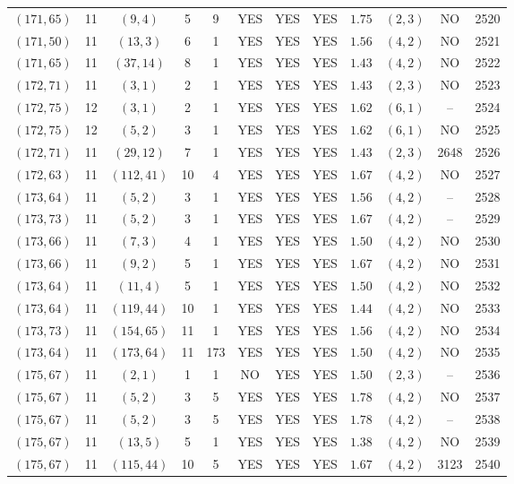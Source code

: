 \begin{longtable}{|c|c|c|c|c|c|c|c|c|c|c|c|}
$(171,65)$ & 11 & $(9,4)$ & 5 & 9 & YES & YES & YES & $1.75$ & $(2,3)$ & NO & 2520\\
$(171,50)$ & 11 & $(13,3)$ & 6 & 1 & YES & YES & YES & $1.56$ & $(4,2)$ & NO & 2521\\
$(171,65)$ & 11 & $(37,14)$ & 8 & 1 & YES & YES & YES & $1.43$ & $(4,2)$ & NO & 2522\\
$(172,71)$ & 11 & $(3,1)$ & 2 & 1 & YES & YES & YES & $1.43$ & $(2,3)$ & NO & 2523\\
$(172,75)$ & 12 & $(3,1)$ & 2 & 1 & YES & YES & YES & $1.62$ & $(6,1)$ & -- & 2524\\
$(172,75)$ & 12 & $(5,2)$ & 3 & 1 & YES & YES & YES & $1.62$ & $(6,1)$ & NO & 2525\\
$(172,71)$ & 11 & $(29,12)$ & 7 & 1 & YES & YES & YES & $1.43$ & $(2,3)$ & 2648 & 2526\\
$(172,63)$ & 11 & $(112,41)$ & 10 & 4 & YES & YES & YES & $1.67$ & $(4,2)$ & NO & 2527\\
$(173,64)$ & 11 & $(5,2)$ & 3 & 1 & YES & YES & YES & $1.56$ & $(4,2)$ & -- & 2528\\
$(173,73)$ & 11 & $(5,2)$ & 3 & 1 & YES & YES & YES & $1.67$ & $(4,2)$ & -- & 2529\\
$(173,66)$ & 11 & $(7,3)$ & 4 & 1 & YES & YES & YES & $1.50$ & $(4,2)$ & NO & 2530\\
$(173,66)$ & 11 & $(9,2)$ & 5 & 1 & YES & YES & YES & $1.67$ & $(4,2)$ & NO & 2531\\
$(173,64)$ & 11 & $(11,4)$ & 5 & 1 & YES & YES & YES & $1.50$ & $(4,2)$ & NO & 2532\\
$(173,64)$ & 11 & $(119,44)$ & 10 & 1 & YES & YES & YES & $1.44$ & $(4,2)$ & NO & 2533\\
$(173,73)$ & 11 & $(154,65)$ & 11 & 1 & YES & YES & YES & $1.56$ & $(4,2)$ & NO & 2534\\
$(173,64)$ & 11 & $(173,64)$ & 11 & 173 & YES & YES & YES & $1.50$ & $(4,2)$ & NO & 2535\\
$(175,67)$ & 11 & $(2,1)$ & 1 & 1 & NO & YES & YES & $1.50$ & $(2,3)$ & -- & 2536\\
$(175,67)$ & 11 & $(5,2)$ & 3 & 5 & YES & YES & YES & $1.78$ & $(4,2)$ & NO & 2537\\
$(175,67)$ & 11 & $(5,2)$ & 3 & 5 & YES & YES & YES & $1.78$ & $(4,2)$ & -- & 2538\\
$(175,67)$ & 11 & $(13,5)$ & 5 & 1 & YES & YES & YES & $1.38$ & $(4,2)$ & NO & 2539\\
$(175,67)$ & 11 & $(115,44)$ & 10 & 5 & YES & YES & YES & $1.67$ & $(4,2)$ & 3123 & 2540\\

\end{longtable}

